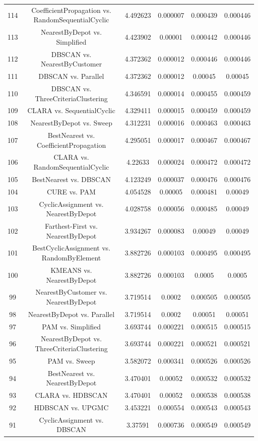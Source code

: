 \documentclass[a4paper,10pt]{article}
\begin{document}
\begin{landscape}
\begin{table}[!htp]
\begin{tabular}{cccccc}
114&CoefficientPropagation vs. RandomSequentialCyclic&4.492623&0.000007&0.000439&0.000446\\
113&NearestByDepot vs. Simplified&4.423902&0.00001&0.000442&0.000446\\
112&DBSCAN vs. NearestByCustomer&4.372362&0.000012&0.000446&0.000446\\
111&DBSCAN vs. Parallel&4.372362&0.000012&0.00045&0.00045\\
110&DBSCAN vs. ThreeCriteriaClustering&4.346591&0.000014&0.000455&0.000459\\
109&CLARA vs. SequentialCyclic&4.329411&0.000015&0.000459&0.000459\\
108&NearestByDepot vs. Sweep&4.312231&0.000016&0.000463&0.000463\\
107&BestNearest vs. CoefficientPropagation&4.295051&0.000017&0.000467&0.000467\\
106&CLARA vs. RandomSequentialCyclic&4.22633&0.000024&0.000472&0.000472\\
105&BestNearest vs. DBSCAN&4.123249&0.000037&0.000476&0.000476\\
104&CURE vs. PAM&4.054528&0.00005&0.000481&0.00049\\
103&CyclicAssignment vs. NearestByDepot&4.028758&0.000056&0.000485&0.00049\\
102&Farthest-First vs. NearestByDepot&3.934267&0.000083&0.00049&0.00049\\
101&BestCyclicAssignment vs. RandomByElement&3.882726&0.000103&0.000495&0.000495\\
100&KMEANS vs. NearestByDepot&3.882726&0.000103&0.0005&0.0005\\
99&NearestByCustomer vs. NearestByDepot&3.719514&0.0002&0.000505&0.000505\\
98&NearestByDepot vs. Parallel&3.719514&0.0002&0.00051&0.00051\\
97&PAM vs. Simplified&3.693744&0.000221&0.000515&0.000515\\
96&NearestByDepot vs. ThreeCriteriaClustering&3.693744&0.000221&0.000521&0.000521\\
95&PAM vs. Sweep&3.582072&0.000341&0.000526&0.000526\\
94&BestNearest vs. NearestByDepot&3.470401&0.00052&0.000532&0.000532\\
93&CLARA vs. HDBSCAN&3.470401&0.00052&0.000538&0.000538\\
92&HDBSCAN vs. UPGMC&3.453221&0.000554&0.000543&0.000543\\
91&CyclicAssignment vs. DBSCAN&3.37591&0.000736&0.000549&0.000549\\

\end{tabular}
\end{table}
\end{landscape}
\end{document}
